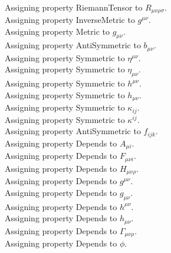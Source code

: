 \documentclass[11pt]{article}
\begin{document}
\\
Assigning property RiemannTensor to ${R}_{\mu \nu \rho \sigma}$.
\\
Assigning property InverseMetric to ${g}^{\mu \nu}$.
\\
Assigning property Metric to ${g}_{\mu \nu}$.
\\
Assigning property AntiSymmetric to ${b}_{\mu \nu}$.
\\
Assigning property Symmetric to ${\eta}^{\mu \nu}$.
\\
Assigning property Symmetric to ${\eta}_{\mu \nu}$.
\\
Assigning property Symmetric to ${h}^{\mu \nu}$.
\\
Assigning property Symmetric to ${h}_{\mu \nu}$.
\\
Assigning property Symmetric to ${\kappa}_{i j}$.
\\
Assigning property Symmetric to ${\kappa}^{i j}$.
\\
Assigning property AntiSymmetric to ${f}_{i j k}$.
\\
Assigning property Depends to ${A}_{\mu i}$.
\\
Assigning property Depends to ${F}_{\mu \nu i}$.
\\
Assigning property Depends to ${H}_{\mu \nu \rho}$.
\\
Assigning property Depends to ${g}^{\mu \nu}$.
\\
Assigning property Depends to ${g}_{\mu \nu}$.
\\
Assigning property Depends to ${h}^{\mu \nu}$.
\\
Assigning property Depends to ${h}_{\mu \nu}$.
\\
Assigning property Depends to ${\Gamma}_{\mu \nu \rho}$.
\\
Assigning property Depends to $\phi$.
\end{document}
